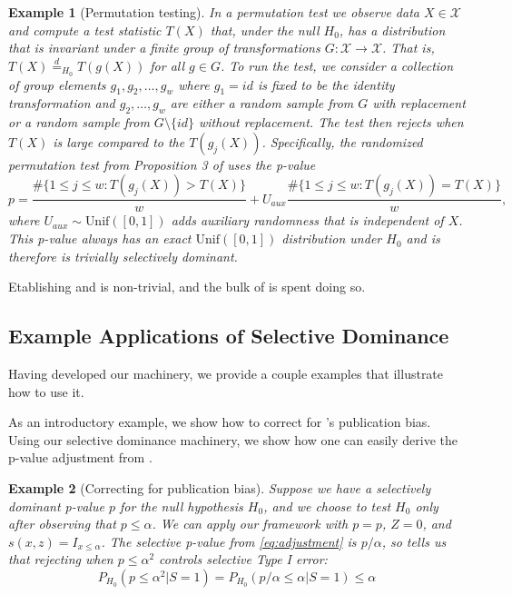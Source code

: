 \documentclass{article}
\newtheorem{example}{Example}
\begin{document}
\begin{example}[Permutation testing]
In a permutation test we observe data $X \in \mathcal{X}$ and compute a test statistic $T(X)$ that, under the null $H_0$, has a distribution that is invariant under a finite group of transformations $G : \mathcal{X} \rightarrow \mathcal{X}$. That is, $T(X) \overset{d}{=}_{H_0} T(g(X))$ for all $ g \in G$. To run the test, we consider a collection of group elements $g_1, g_2, \dots, g_w$ where $g_1 = id$ is fixed to be the identity transformation and $g_2, \dots, g_w$ are either a random sample from $G$ with replacement or a random sample from $G \setminus \{id \}$ without replacement. The test then rejects when $T(X)$ is large compared to the $T(g_j(X))$. Specifically, the randomized permutation test from Proposition 3 of \cite{Hemerik} uses the p-value
\begin{equation*}
    p = \frac{\#\{1 \leq j \leq w : T(g_j(X)) > T(X) \}}{w} + U_{aux} \frac{\#\{1 \leq j \leq w : T(g_j(X)) = T(X) \}}{w},
\end{equation*}
where $U_{aux} \sim \text{Unif}([0, 1])$ adds auxiliary randomness that is independent of $X$. This p-value always has an exact $\text{Unif}([0, 1])$ distribution under $H_0$ and is therefore is trivially selectively dominant. 
\end{example}

Etablishing  and  is non-trivial, and the bulk of  is spent doing so. 

\subsection{Example Applications of Selective Dominance}

Having developed our machinery, we provide a couple examples that illustrate how to use it.

As an introductory example, we show how to correct for 's publication bias. Using our selective dominance machinery, we show how one can easily derive the p-value adjustment from \cite{Hung2020}. 

\begin{example}[Correcting for publication bias]
\label{exm:correction}
Suppose we have a selectively dominant p-value $p$ for the null hypothesis $H_0$, and we choose to test $H_0$ only after observing that $p \leq \alpha$. We can apply our framework with $p=p$, $Z=0$, and $s(x, z) = I_{x \leq \alpha}$. The selective p-value from \eqref{eq:adjustment} is $p/\alpha$, so  tells us that rejecting when $p \leq \alpha^2$ controls selective Type I error:
\begin{equation*}
    P_{H_0}(p \leq \alpha^2 | S= 1) =  P_{H_0}(p/\alpha \leq \alpha | S= 1) \leq \alpha  
\end{equation*}
\end{example}
\end{document}
